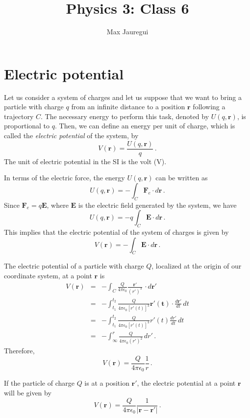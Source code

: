 \documentclass[11pt,a4paper]{article}
\title{Physics 3: Class 6}
\author{Max Jauregui}
\theoremstyle{definition}
\begin{document}
\maketitle

\section{Electric potential}

Let us consider a system of charges and let us suppose that we want to
bring a particle with charge $q$ from an infinite distance to a
position $\mathbf{r}$ following a trajectory $C$. The necessary energy
to perform this task, denoted by $U(q,\mathbf{r})$, is proportional to
$q$. Then, we can define an energy per unit of charge, which is called
the \emph{electric potential} of the system, by
$$V(\mathbf{r})=\frac{U(q,\mathbf{r})}{q}\,.$$
The unit of electric potential in the SI is the volt (V).

In terms of the electric force, the energy $U(q,\mathbf{r})$ can be
written as
$$U(q,\mathbf{r})=-\int_C\mathbf{F}_e\cdot d\mathbf{r}\,.$$
Since $\mathbf{F}_e=q\mathbf{E}$, where $\mathbf{E}$ is the electric
field generated by the system, we have
$$U(q,\mathbf{r})=-q\int_C \mathbf{E}\cdot d\mathbf{r}\,.$$
This implies that the electric potential of the system of charges is
given by
\begin{equation}
  \label{eq:1}
  V(\mathbf{r})=-\int_C\mathbf{E}\cdot d\mathbf{r}\,.
\end{equation}

The electric potential of a particle with charge $Q$, localized at the
origin of our coordinate system, at a point $\mathbf{r}$ is
\begin{eqnarray*}
  V(\mathbf{r})&=&-\int_C\frac{Q}{4\pi \epsilon_0}\frac{\mathbf{r'}}{(r')^3}\,\cdot d\mathbf{r}'\\
               &=&-\int_{t_1}^{t_2}\frac{Q}{4\pi \epsilon_0[r'(t)]^3}\mathbf{r'(t)}\cdot\frac{d\mathbf{r}'}{dt}\,dt\\
               &=&-\int_{t_1}^{t_2}\frac{Q}{4\pi \epsilon_0[r'(t)]^3}r'(t)\frac{dr'}{dt}\,dt\\
               &=&-\int_{\infty}^{r}\frac{Q}{4\pi \epsilon_0(r')^2}\,dr'\,.
\end{eqnarray*}
Therefore,
$$V(\mathbf{r})=\frac{Q}{4\pi\epsilon_0}\frac{1}{r}\,.$$

If the particle of charge $Q$ is at a position $\mathbf{r'}$, the
electric potential at a point $\mathbf{r}$ will be given by
$$V(\mathbf{r})=\frac{Q}{4\pi\epsilon_0}\frac{1}{|\mathbf{r}-\mathbf{r}'|}\,.$$
\end{document}
